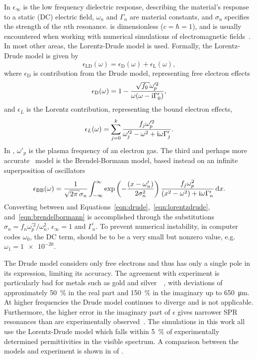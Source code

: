 In  $\epsilon_\infty$ is the low frequency
dielectric response, describing the material's response to a static (DC)
electric field, $\omega_n$ and $\Gamma_n$ are material constants, and
$\sigma_n$ specifies the strength of the $n$th resonance.
 is dimensionless ($c=\hbar=1$), and is usually
encountered when working with numerical simulations of electromagnetic
fields~\cite{oskooi2010meep}.  In most other areas, the Lorentz-Drude model is
used.  Formally, the Lorentz-Drude model is given by
\begin{equation}
\epsilon_\mathrm{LD}(\omega)=\epsilon_\mathrm{D}(\omega)+\epsilon_\mathrm{L}(\omega),
\end{equation}
where $\epsilon_\mathrm{D}$ is contribution from the Drude model, representing
free electron effects
\begin{align}
\epsilon_\mathrm{D}(\omega)=1-\frac{\sqrt{f_0} \omega_p^{\prime 2}}{\omega(\omega -
\mi\Gamma_0^\prime)},
\label{eqn:drude}
\end{align}
and $\epsilon_L$ is the Lorentz contribution, representing the bound
electron effects,
\begin{align}
\epsilon_L(\omega) =\sum_{j=0}^{k}\frac{f_j\omega_p^{\prime 2}}{\omega_j^{\prime
2}-\omega^2+{\mathrm{i}}\omega\Gamma_j^\prime}.
\label{eqn:lorentzdrude}
\end{align}
In , $\omega'_p$ is the plasma frequency of an
electron gas.  The third and perhaps more
accurate~\cite{jahanshahi2014study} model is the
Brendel-Bormann model, based instead on an infinite superposition
of oscillators
\begin{align}
\epsilon_\text{BB}(\omega) = \frac{1}{\sqrt{2 \pi} \sigma_n} \intinfty
\exp\left(-\frac{(x-\omega'_n)}{2 \sigma_n^2}\right)
\frac{f_j \omega_p^2}{(x^2-\omega^2)+\mi \omega \Gamma'_n} \md x.
\label{eqn:brendelbormann}
\end{align}
Converting between  and
Equations~\ref{eqn:drude},~\ref{eqn:lorentzdrude},
and~\ref{eqn:brendelbormann} is accomplished through the substitutions
$\sigma_n = {f_n \omega_p^{\prime 2}}/{\omega_n^2}$, $\epsilon_\infty=1$ and
$\Gamma_n^\prime$.  To prevent numerical instability, in computer codes
$\omega_0$, the DC term, should be to be a very small but nonzero value, e.g.
$\omega_1 = \num{1e-20}$. 

The Drude model considers only free electrons and thus has only a single pole
in its expression, limiting its accuracy.  The agreement with experiment is
particularly bad for metals such as gold and
silver~\cite{ahmedcomputational}~\cite{jahanshahi2014study}, with deviations
of approximately \SI{50}{\percent} in the real part and \SI{150}{\percent} in
the imaginary up to \SI{650}{\micro\meter}.  At higher frequencies the Drude
model continues to diverge and is not applicable.  Furthermore, the higher
error in the imaginary part of $\epsilon$ gives narrower SPR resonances than
are experimentally observed~\cite{jahanshahi2014study}.  The simulations in
this work all use the Lorentz-Drude model which falls within \SI{5}{\percent}
of experimentally determined permittivities in the visible spectrum. A
comparison between the models and experiment is shown in
 of .
